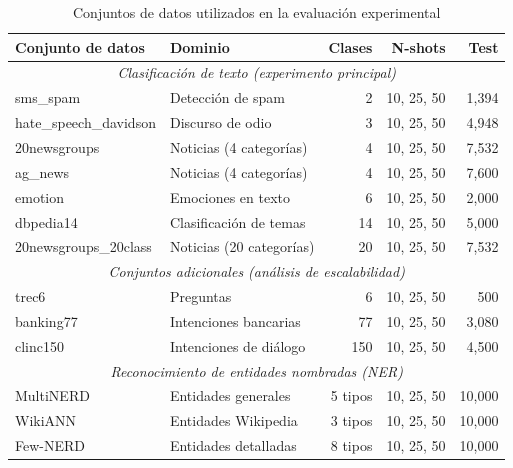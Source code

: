 \begin{table}[htbp]
\centering
\caption{Conjuntos de datos utilizados en la evaluación experimental}
\label{tab:datasets_summary}
\begin{tabular}{llrrr}
\toprule
\textbf{Conjunto de datos} & \textbf{Dominio} & \textbf{Clases} & \textbf{N-shots} & \textbf{Test} \\
\midrule
\multicolumn{5}{c}{\textit{Clasificación de texto (experimento principal)}} \\
\midrule
sms\_spam             & Detección de spam       & 2  & 10, 25, 50 & 1,394 \\
hate\_speech\_davidson & Discurso de odio        & 3  & 10, 25, 50 & 4,948 \\
20newsgroups          & Noticias (4 categorías) & 4  & 10, 25, 50 & 7,532 \\
ag\_news              & Noticias (4 categorías) & 4  & 10, 25, 50 & 7,600 \\
emotion               & Emociones en texto      & 6  & 10, 25, 50 & 2,000 \\
dbpedia14             & Clasificación de temas  & 14 & 10, 25, 50 & 5,000 \\
20newsgroups\_20class & Noticias (20 categorías)& 20 & 10, 25, 50 & 7,532 \\
\midrule
\multicolumn{5}{c}{\textit{Conjuntos adicionales (análisis de escalabilidad)}} \\
\midrule
trec6                 & Preguntas              & 6   & 10, 25, 50 & 500 \\
banking77             & Intenciones bancarias  & 77  & 10, 25, 50 & 3,080 \\
clinc150              & Intenciones de diálogo & 150 & 10, 25, 50 & 4,500 \\
\midrule
\multicolumn{5}{c}{\textit{Reconocimiento de entidades nombradas (NER)}} \\
\midrule
MultiNERD             & Entidades generales    & 5 tipos  & 10, 25, 50 & 10,000 \\
WikiANN               & Entidades Wikipedia    & 3 tipos  & 10, 25, 50 & 10,000 \\
Few-NERD              & Entidades detalladas   & 8 tipos  & 10, 25, 50 & 10,000 \\
\bottomrule
\end{tabular}
\end{table}
